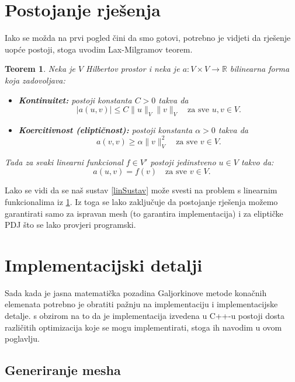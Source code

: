 \documentclass[zavrsnirad]{../fer}
\newtheorem{teorem}{Teorem}
\begin{document}
\section{Postojanje rješenja}
\label{postojanje}
Iako se možda na prvi pogled čini da smo gotovi, potrebno 
je vidjeti da rješenje uopće postoji, stoga uvodim 
Lax-Milgramov teorem.
\begin{teorem}
  \label{laxMil}
Neka je $ V $ Hilbertov prostor i neka je $ a: V \times V \rightarrow \mathbb{R} $ bilinearna forma koja zadovoljava:
\begin{itemize}
    \item \textbf{Kontinuitet:} postoji konstanta $ C > 0 $ takva da
    $$
    |a(u, v)| \leq C \|u\|_V \|v\|_V \quad \text{za sve } u, v \in V.
    $$
    
    \item \textbf{Koercitivnost (eliptičnost):} postoji konstanta $ \alpha > 0 $ takva da
    $$
    a(v, v) \geq \alpha \|v\|_V^2 \quad \text{za sve } v \in V.
    $$
\end{itemize}

Tada za svaki linearni funkcional $ f \in V' $ postoji jedinstveno $ u \in V $ takvo da:
$$
a(u, v) = f(v) \quad \text{za sve } v \in V.
$$
\end{teorem}
Lako se vidi da se naš sustav \ref{linSustav} 
može svesti na problem s linearnim funkcionalima iz
\ref{laxMil}. Iz toga se lako zaključuje da
postojanje rješenja možemo garantirati samo za ispravan mesh
(to garantira implementacija) i za eliptičke PDJ što se lako provjeri programski.

\section{Implementacijski detalji}
\label{implementacijaOpis}
Sada kada je jasna matematička pozadina 
Galjorkinove metode konačnih elemenata potrebno je 
obratiti pažnju na implementaciju i implementacijske detalje.
s obzirom na to da je implementacija izvedena u C++-u postoji
dosta različitih optimizacija koje se mogu implementirati,
stoga ih navodim u ovom poglavlju.

\subsection{Generiranje mesha}
\end{document}
